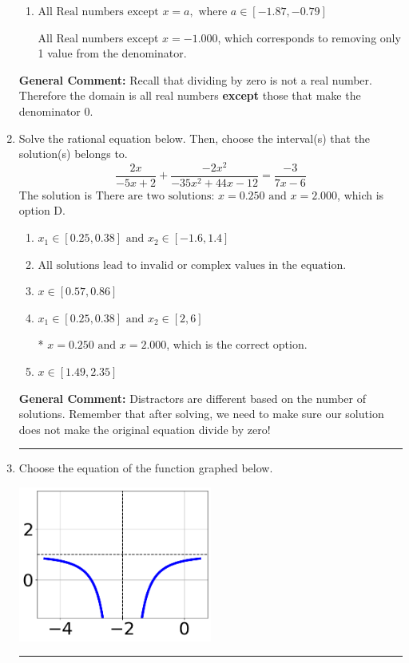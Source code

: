 \documentclass{extbook}[14pt]
\newcommand{\litem}[1]{\item #1

\rule{\textwidth}{0.4pt}}
\begin{document}
\begin{enumerate}
{\begin{enumerate}[label=\Alph*.]
All Real numbers except $x = -25.000$ and $x = -15.000$, which corresponds to not factoring the denominator correctly.
\item \( \text{All Real numbers except } x = a, \text{ where } a \in [-1.87, -0.79] \)

All Real numbers except $x = -1.000$, which corresponds to removing only 1 value from the denominator.
\end{enumerate}

\textbf{General Comment:} Recall that dividing by zero is not a real number. Therefore the domain is all real numbers \textbf{except} those that make the denominator 0.
}
\litem{
Solve the rational equation below. Then, choose the interval(s) that the solution(s) belongs to.
\[ \frac{2x}{-5x + 2} + \frac{-2x^{2}}{-35x^{2} +44 x -12} = \frac{-3}{7x -6} \]
The solution is \( \text{There are two solutions: } x = 0.250 \text{ and } x = 2.000 \), which is option D.\begin{enumerate}[label=\Alph*.]
\item \( x_1 \in [0.25, 0.38] \text{ and } x_2 \in [-1.6,1.4] \)


\item \( \text{All solutions lead to invalid or complex values in the equation.} \)


\item \( x \in [0.57,0.86] \)


\item \( x_1 \in [0.25, 0.38] \text{ and } x_2 \in [2,6] \)

* $x = 0.250 \text{ and } x = 2.000$, which is the correct option.
\item \( x \in [1.49,2.35] \)


\end{enumerate}

\textbf{General Comment:} Distractors are different based on the number of solutions. Remember that after solving, we need to make sure our solution does not make the original equation divide by zero!
}
\litem{
Choose the equation of the function graphed below.

\begin{center}
    \includegraphics[width=0.5\textwidth]{../Figures/rationalGraphToEquationCopyC.png}
\end{center}



}
\end{enumerate}
\end{document}
